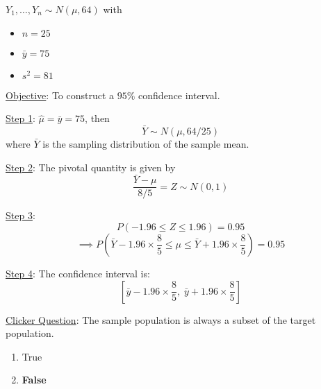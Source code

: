 \begin{exbox}
    \begin{example}
        $ Y_1,\ldots ,Y_n \sim N(\mu,64) $ with
        \begin{itemize}
            \item $ n=25 $
            \item $ \bar{y}=75 $
            \item $ s^2=81 $
        \end{itemize}
        \underline{Objective}: To construct a $ 95\% $ confidence interval.

        \underline{Step 1}: $ \hat{\mu}=\bar{y}=75 $, then
        \[ \bar{Y} \sim N(\mu,64/25) \]
        where $ \bar{Y} $ is the sampling distribution of the sample mean.

        \underline{Step 2}: The pivotal quantity is given by
        \[ \frac{\bar{Y}-\mu}{8/5} =Z \sim N(0,1) \]

        \underline{Step 3}:
        \[ P\left(-1.96\leqslant Z\leqslant 1.96\right)=0.95 \]
        \[ \implies P\left( \bar{Y}-1.96\times \frac{8}{5} \leqslant \mu
            \leqslant \bar{Y}+1.96\times \frac{8}{5} \right)=0.95 \]

        \underline{Step 4}: The confidence interval is:
        \[ \left[ \bar{y}-1.96\times \frac{8}{5},\;\bar{y}+1.96\times \frac{8}{5} \right] \]
    \end{example}
\end{exbox}

\underline{Clicker Question}: The sample population is always a subset of the target
population.
\begin{enumerate}[label=(\alph*)]
    \item True
    \item \textbf{False}
\end{enumerate}
